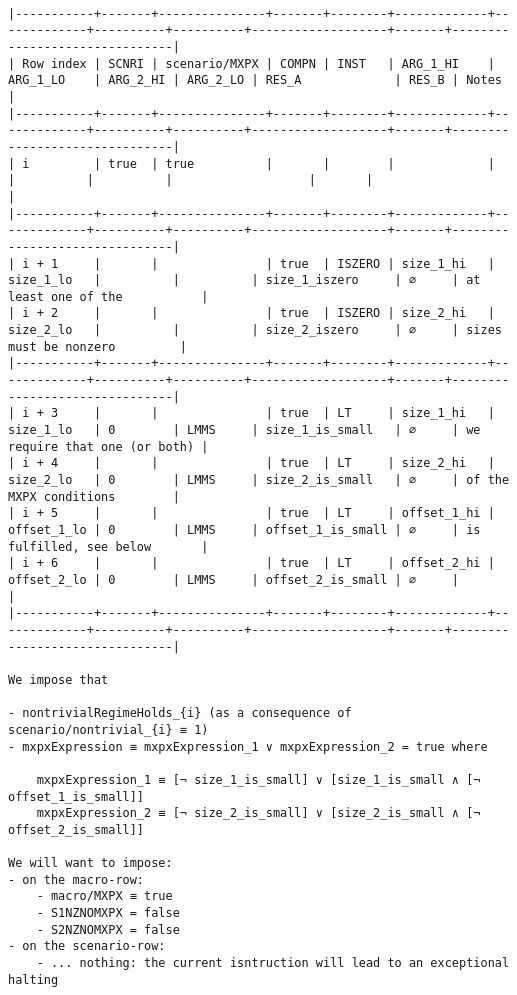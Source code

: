 \documentclass[varwidth=\maxdimen,margin=0.5cm,multi={verbatim}]{standalone}
\begin{document}
\begin{verbatim}

|-----------+-------+---------------+-------+--------+-------------+-------------+----------+----------+-------------------+-------+-------------------------------|
| Row index | SCNRI | scenario/MXPX | COMPN | INST   | ARG_1_HI    | ARG_1_LO    | ARG_2_HI | ARG_2_LO | RES_A             | RES_B | Notes                         |
|-----------+-------+---------------+-------+--------+-------------+-------------+----------+----------+-------------------+-------+-------------------------------|
| i         | true  | true          |       |        |             |             |          |          |                   |       |                               |
|-----------+-------+---------------+-------+--------+-------------+-------------+----------+----------+-------------------+-------+-------------------------------|
| i + 1     |       |               | true  | ISZERO | size_1_hi   | size_1_lo   |          |          | size_1_iszero     | ∅     | at least one of the           |
| i + 2     |       |               | true  | ISZERO | size_2_hi   | size_2_lo   |          |          | size_2_iszero     | ∅     | sizes must be nonzero         |
|-----------+-------+---------------+-------+--------+-------------+-------------+----------+----------+-------------------+-------+-------------------------------|
| i + 3     |       |               | true  | LT     | size_1_hi   | size_1_lo   | 0        | LMMS     | size_1_is_small   | ∅     | we require that one (or both) |
| i + 4     |       |               | true  | LT     | size_2_hi   | size_2_lo   | 0        | LMMS     | size_2_is_small   | ∅     | of the MXPX conditions        |
| i + 5     |       |               | true  | LT     | offset_1_hi | offset_1_lo | 0        | LMMS     | offset_1_is_small | ∅     | is fulfilled, see below       |
| i + 6     |       |               | true  | LT     | offset_2_hi | offset_2_lo | 0        | LMMS     | offset_2_is_small | ∅     |                               |
|-----------+-------+---------------+-------+--------+-------------+-------------+----------+----------+-------------------+-------+-------------------------------|

We impose that

- nontrivialRegimeHolds_{i} (as a consequence of scenario/nontrivial_{i} ≡ 1)
- mxpxExpression ≡ mxpxExpression_1 ∨ mxpxExpression_2 = true where

	mxpxExpression_1 ≡ [¬ size_1_is_small] ∨ [size_1_is_small ∧ [¬ offset_1_is_small]]
	mxpxExpression_2 ≡ [¬ size_2_is_small] ∨ [size_2_is_small ∧ [¬ offset_2_is_small]]

We will want to impose:
- on the macro-row:
	- macro/MXPX ≡ true
	- S1NZNOMXPX = false
	- S2NZNOMXPX = false
- on the scenario-row:
	- ... nothing: the current isntruction will lead to an exceptional halting

\end{verbatim}
\end{document}
